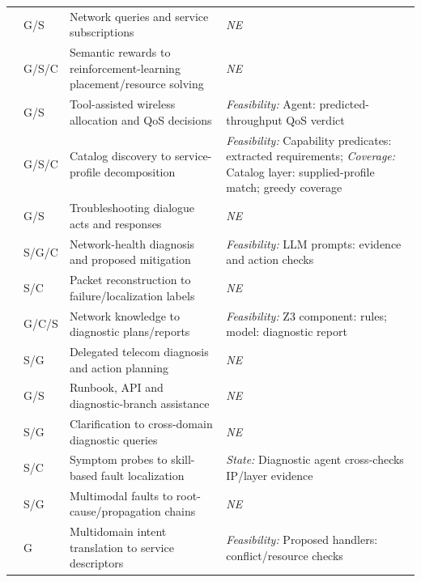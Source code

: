 \begin{longtable}{>{\raggedright\arraybackslash}p{.09\soklitwidth}>{\centering\arraybackslash}p{.07\soklitwidth}>{\raggedright\arraybackslash}p{.36\soklitwidth}>{\raggedright\arraybackslash}p{.48\soklitwidth}}
\addlinespace[1pt]
\cite{e0arxiv250708164} & G/S & Network queries and service subscriptions & \textit{NE} \\
\addlinespace[1pt]
\cite{e0arxiv260316458} & G/S/C & Semantic rewards to reinforcement-learning placement/resource solving & \textit{NE} \\
\addlinespace[1pt]
\cite{e0arxiv260321251} & G/S & Tool-assisted wireless allocation and QoS decisions & \emph{Feasibility:} Agent: predicted-throughput QoS verdict \\
\addlinespace[1pt]
\cite{martins2026intentdriven} & G/S/C & Catalog discovery to service-profile decomposition & \emph{Feasibility:} Capability predicates: extracted requirements; \emph{Coverage:} Catalog layer: supplied-profile match; greedy coverage \\
\addlinespace[1pt]
\cite{e0arxiv190905528} & G/S & Troubleshooting dialogue acts and responses & \textit{NE} \\
\addlinespace[1pt]
\cite{e0arxiv240608305} & S/G/C & Network-health diagnosis and proposed mitigation & \emph{Feasibility:} LLM prompts: evidence and action checks \\
\addlinespace[1pt]
\cite{e0arxiv240706085} & S/C & Packet reconstruction to failure/localization labels & \textit{NE} \\
\addlinespace[1pt]
\cite{e0arxiv250116842} & G/C/S & Network knowledge to diagnostic plans/reports & \emph{Feasibility:} Z3 component: rules; model: diagnostic report \\
\addlinespace[1pt]
\cite{e0arxiv251100651} & S/G & Delegated telecom diagnosis and action planning & \textit{NE} \\
\addlinespace[1pt]
\cite{e0arxiv260405400} & G/S & Runbook, API and diagnostic-branch assistance & \textit{NE} \\
\addlinespace[1pt]
\cite{e0arxiv260413353} & S/G & Clarification to cross-domain diagnostic queries & \textit{NE} \\
\addlinespace[1pt]
\cite{e0arxiv260504530} & S/C & Symptom probes to skill-based fault localization & \emph{State:} Diagnostic agent cross-checks IP/layer evidence \\
\addlinespace[1pt]
\cite{e0arxiv260600582} & S/G & Multimodal faults to root-cause/propagation chains & \textit{NE} \\
\addlinespace[1pt]
\cite{e0sourceS01} & G & Multidomain intent translation to service descriptors & \emph{Feasibility:} Proposed handlers: conflict/resource checks \\

\end{longtable}

